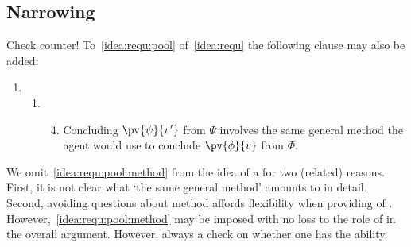 \subsection*{Narrowing }

\begin{note}
  {
    \color{red} Check counter!
  }
  To~\ref{idea:requ:pool} of~\autoref{idea:requ} the following clause may also be added:
  \begin{enumerate}[label=]
  \item
    \begin{enumerate}[label=]
    \item
      \begin{enumerate}[label=\roman*., ref=(\roman*)]
        \setcounter{enumiii}{3}
      \item
        \label{idea:requ:pool:method}
        Concluding \(\pv{\psi}{v'}\) from \(\Psi\) involves the same general method the agent would use to conclude \(\pv{\phi}{v}\) from \(\Phi\).
      \end{enumerate}
    \end{enumerate}
  \end{enumerate}
  We omit~\autoref{idea:requ:pool:method} from the idea of a \requ{} for two (related) reasons.
  First, it is not clear what `the same general method' amounts to in detail.
  Second, avoiding questions about method affords flexibility when providing  of \zS{}.
  However,~\autoref{idea:requ:pool:method} may be imposed with no loss to the role of \zS{} in the overall argument.
  However, always a check on whether one has the \abgen{} ability.
\end{note}


